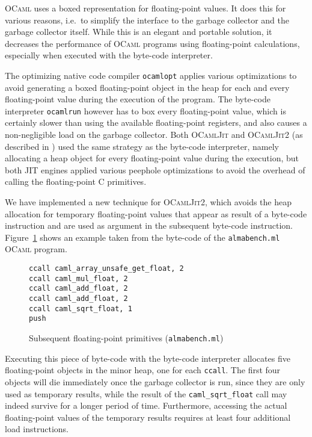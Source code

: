 \documentclass[12pt,a4paper,final]{article}
\begin{document}
\textsc{OCaml} uses a boxed representation for floating-point values. It does this
for various reasons, i.e.~to simplify the interface to the garbage collector
and the garbage collector itself. While this is an elegant and portable solution, it decreases
the performance of \textsc{OCaml} programs using floating-point calculations, especially
when executed with the byte-code interpreter.

The optimizing native code compiler \texttt{ocamlopt} applies various optimizations to avoid generating
a boxed floating-point object in the heap for each and every floating-point value during
the execution of the program. The byte-code interpreter \texttt{ocamlrun} however has to box every floating-point
value, which is certainly slower than using the available floating-point registers, and
also causes a non-negligible load on the garbage collector. Both \textsc{OCamlJit} and
\textsc{OCamlJit2} (as described in \cite{Meurer10:OCamlJit2.0}) used the same strategy
as the byte-code interpreter, namely allocating a heap object for every floating-point
value during the execution, but both JIT engines applied various peephole optimizations
to avoid the overhead of calling the floating-point C primitives.

We have implemented a new technique for \textsc{OCamlJit2}, which avoids the heap
allocation for temporary floating-point values that appear as result of a byte-code
instruction and are used as argument in the subsequent byte-code instruction.
Figure~\ref{figure:Subsequent_floating_point_primitives_almabench} shows an example
taken from the byte-code of the \texttt{almabench.ml} \textsc{OCaml} program.

\begin{figure}[h]
  \centering
  \begin{varwidth}{\linewidth}
\begin{verbatim}
ccall caml_array_unsafe_get_float, 2
ccall caml_mul_float, 2
ccall caml_add_float, 2
ccall caml_add_float, 2
ccall caml_sqrt_float, 1
push
\end{verbatim}
  \end{varwidth}
  \caption{Subsequent floating-point primitives (\texttt{almabench.ml})}
  \label{figure:Subsequent_floating_point_primitives_almabench}
\end{figure}

Executing this piece of byte-code with the byte-code interpreter allocates five
floating-point objects in the minor heap, one for each \texttt{ccall}. The first
four objects will die immediately once the garbage collector is run, since they
are only used as temporary results, while the result of the \texttt{caml\_sqrt\_float}
call may indeed survive for a longer period of time. Furthermore, accessing the
actual floating-point values of the temporary results requires at least four
additional load instructions.
\end{document}
